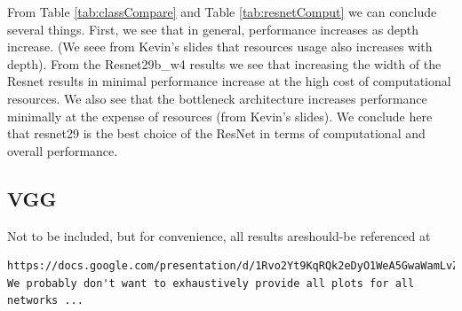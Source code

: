 \documentclass[11pt,a4paper]{article}
\begin{document}



\par From Table \ref{tab:classCompare} and Table \ref{tab:resnetComput} we can conclude several things.  First, we see that in general, performance increases as depth increase.  (We seee from Kevin's slides that resources usage also increases with depth). From the Resnet29b\_w4 results we see that increasing the width of the Resnet results in minimal performance increase at the high cost of computational resources.  We also see that the bottleneck architecture increases performance minimally at the expense of resources (from Kevin's slides).  We conclude here that resnet29 is the best choice of the ResNet in terms of computational and overall performance.  

\subsection{VGG}


{\color{red} Not to be included, but for convenience, all results are\/should-be referenced at 
\begin{verbatim}https://docs.google.com/presentation/d/1Rvo2Yt9KqRQk2eDyO1WeA5GwaWamLvZR2CR3txfYbBE/edit#slide=id.g1ec338afdf_0_11. We probably don't want to exhaustively provide all plots for all networks ...
\end{verbatim}
}

\end{document}
